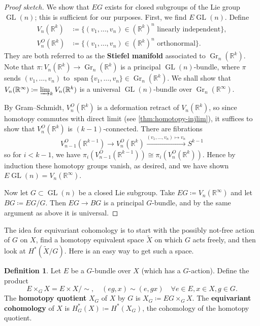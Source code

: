 \documentclass{report}
\theoremstyle{plain}
\theoremstyle{definition}
\newtheorem{definition}[theorem]{Definition}
\theoremstyle{remark}
\newcommand{\bR}{\mathbb{R}}
\DeclareMathOperator{\vspan}{span}
\DeclareMathOperator{\GL}{GL}
\DeclareMathOperator{\Gr}{Gr}
\begin{document}
\begin{proof}[Proof sketch]
  We show that $EG$ exists for closed subgroups of the Lie group
  $\GL(n)$; this is sufficient for our purposes. First, we find
  $E\GL(n)$. Define
  \begin{align*}
    V_n(\bR^k) &\coloneqq \{(v_1, \ldots, v_n) \in (\bR^k)^n \text{ linearly independent}\}, \\
    V_n^O(\bR^k) &\coloneqq \{(v_1, \ldots, v_n) \in (\bR^k)^n \text{ orthonormal}\}.
  \end{align*}
  They are both referred to as the {\bf Stiefel manifold} associated
  to $\Gr_n(\bR^k)$. Note that $\pi\colon V_n(\bR^k) \to \Gr_n(\bR^k)$
  is a principal $\GL(n)$-bundle, where $\pi$ sends $(v_1, \ldots,
  v_n)$ to $\vspan\{v_1, \ldots, v_n\} \in \Gr_n(\bR^k)$. We shall
  show that $V_n(\bR^\infty) \coloneqq \varinjlim_k V_n(\bR^k)$ is a
  universal $\GL(n)$-bundle over $\Gr_n(\bR^\infty)$.

  By Gram--Schmidt, $V_n^O(\bR^k)$ is a deformation retract of
  $V_n(\bR^k)$, so since homotopy commutes with direct limit (see
  \ref{thm:homotopy-injlim}), it suffices to show that $V_n^O(\bR^k)$
  is $(k-1)$-connected. There are fibrations
  \[ V_{n-1}^O(\bR^{k-1}) \to V_n^O(\bR^k) \xrightarrow{(v_1, \ldots, v_n) \mapsto v_n} S^{k-1} \]
  so for $i < k-1$, we have $\pi_i(V_{n-1}^O(\bR^{k-1})) \cong
  \pi_i(V_n^O(\bR^k))$. Hence by induction these homotopy groups
  vanish, as desired, and we have shown $E\GL(n) = V_n(\bR^\infty)$.

  Now let $G \subset \GL(n)$ be a closed Lie subgroup. Take $EG
  \coloneqq V_n(\bR^\infty)$ and let $BG \coloneqq EG/G$. Then $EG \to
  BG$ is a principal $G$-bundle, and by the same argument as above it
  is universal.
\end{proof}

The idea for equivariant cohomology is to start with the possibly
not-free action of $G$ on $X$, find a homotopy equivalent space
$\tilde{X}$ on which $G$ acts freely, and then look at
$H^*(\tilde{X}/G)$. Here is an easy way to get such a space.

\begin{definition} \label{def:homotopy-quotient}
  Let $E$ be a $G$-bundle over $X$ (which has a $G$-action). Define
  the product
  \[ E \times_G X = E \times X / \sim, \quad (eg, x) \sim (e, gx) \quad \forall e \in E, x \in X, g \in G. \]
  The {\bf homotopy quotient} $X_G$ of $X$ by $G$ is $X_G \coloneqq EG
  \times_G X$. The {\bf equivariant cohomology} of $X$ is $H^*_G(X)
  \coloneqq H^*(X_G)$, the cohomology of the homotopy quotient.
\end{definition}
\end{document}
